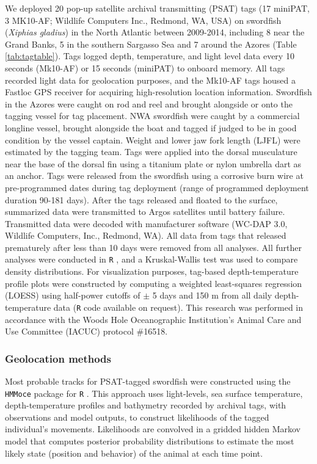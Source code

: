 We deployed 20 pop-up satellite archival transmitting (PSAT) tags (17 miniPAT, 3 MK10-AF; Wildlife Computers Inc., Redmond, WA, USA) on swordfish (\textit{Xiphias gladius}) in the North Atlantic between 2009-2014, including 8 near the Grand Banks, 5 in the southern Sargasso Sea and 7 around the Azores (Table \ref{tab:tagtable}). Tags logged depth, temperature, and light level data every 10 seconds (Mk10-AF) or 15 seconds (miniPAT) to onboard memory. All tags recorded light data for geolocation purposes, and the Mk10-AF tags housed a Fastloc GPS receiver for acquiring high-resolution location information. Swordfish in the Azores were caught on rod and reel and brought alongside or onto the tagging vessel for tag placement. NWA swordfish were caught by a commercial longline vessel, brought alongside the boat and tagged if judged to be in good condition by the vessel captain. Weight and lower jaw fork length (LJFL) were estimated by the tagging team. Tags were applied into the dorsal musculature near the base of the dorsal fin using a titanium plate or nylon umbrella dart as an anchor. Tags were released from the swordfish using a corrosive burn wire at pre-programmed dates during tag deployment (range of programmed deployment duration 90-181 days). After the tags released and floated to the surface, summarized data were transmitted to Argos satellites until battery failure. Transmitted data were decoded with manufacturer software (WC-DAP 3.0, Wildlife Computers, Inc., Redmond, WA). All data from tags that released prematurely after less than 10 days were removed from all analyses. All further analyses were conducted in \texttt{R} \citep{RDevelopmentCoreTeam2015}, and a Kruskal-Wallis test was used to compare density distributions. For visualization purposes, tag-based depth-temperature profile plots were constructed by computing a weighted least-squares regression (LOESS) using half-power cutoffs of $\pm$ 5 days and 150 m from all daily depth-temperature data (\texttt{R} code available on request). This research was performed in accordance with the Woods Hole Oceanographic Institution's Animal Care and Use Committee (IACUC) protocol \#16518.

\subsubsection{Geolocation methods}

Most probable tracks for PSAT-tagged swordfish were constructed using the \texttt{HMMoce} package \citep{Braun2018a} for \texttt{R} \citep{RDevelopmentCoreTeam2015}. This approach uses light-levels, sea surface temperature, depth-temperature profiles and bathymetry recorded by archival tags, with observations and model outputs, to construct likelihoods of the tagged individual's movements. Likelihoods are convolved in a gridded hidden Markov model that computes posterior probability distributions to estimate the most likely state (position and behavior) of the animal at each time point.

